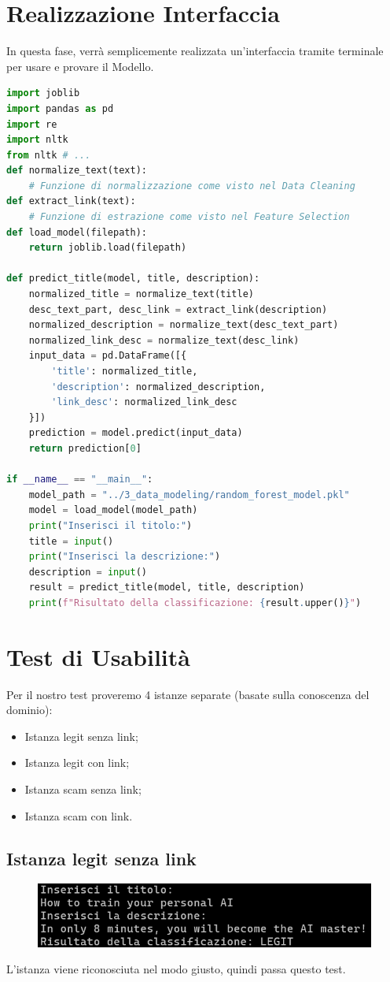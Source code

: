 \documentclass[a4paper,12pt]{report}
\begin{document}
\section{Realizzazione Interfaccia}
In questa fase, verrà semplicemente realizzata un'interfaccia tramite terminale per usare e provare il Modello.
\begin{lstlisting}[language=Python]
import joblib
import pandas as pd
import re
import nltk
from nltk # ...
def normalize_text(text):
    # Funzione di normalizzazione come visto nel Data Cleaning
def extract_link(text):
    # Funzione di estrazione come visto nel Feature Selection
def load_model(filepath):
    return joblib.load(filepath)

def predict_title(model, title, description):
    normalized_title = normalize_text(title)
    desc_text_part, desc_link = extract_link(description)
    normalized_description = normalize_text(desc_text_part)
    normalized_link_desc = normalize_text(desc_link)
    input_data = pd.DataFrame([{
        'title': normalized_title,
        'description': normalized_description,
        'link_desc': normalized_link_desc
    }])
    prediction = model.predict(input_data)
    return prediction[0]
    
if __name__ == "__main__":
    model_path = "../3_data_modeling/random_forest_model.pkl"
    model = load_model(model_path)
    print("Inserisci il titolo:")
    title = input()
    print("Inserisci la descrizione:")
    description = input()
    result = predict_title(model, title, description)
    print(f"Risultato della classificazione: {result.upper()}")
\end{lstlisting}
\section{Test di Usabilità}
Per il nostro test proveremo 4 istanze separate (basate sulla conoscenza del dominio):
\begin{itemize}
    \item Istanza legit senza link;
    \item Istanza legit con link;
    \item Istanza scam senza link;
    \item Istanza scam con link.
\end{itemize}
\subsection{Istanza legit senza link}
\begin{figure}[h]
\centering
\includegraphics[width=\textwidth]{deploy_legit_nolink.png}
\end{figure}
L'istanza viene riconosciuta nel modo giusto, quindi passa questo test.
\end{document}
